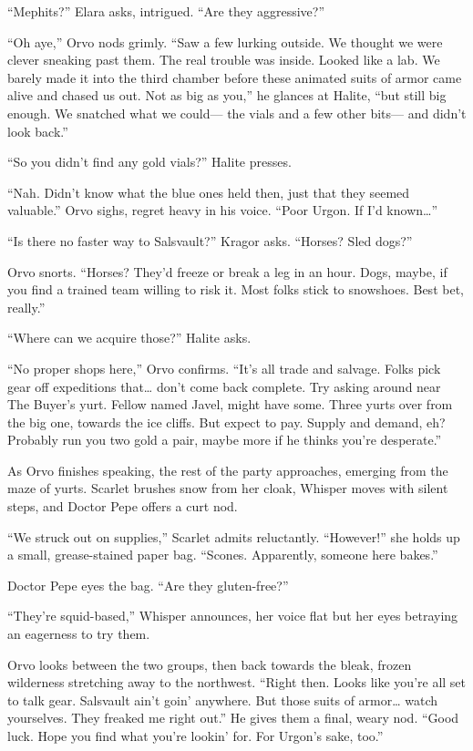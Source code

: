 \documentclass[
  letterpaper,12pt,twoside,twocolumn,openany,
  nodeprecatedcode,bg=full]{dndbook}
\begin{document}
``Mephits?'' Elara asks, intrigued. ``Are they aggressive?''

``Oh aye,'' Orvo nods grimly. ``Saw a few lurking outside. We thought we
were clever sneaking past them. The real trouble was inside. Looked like
a lab. We barely made it into the third chamber before these animated
suits of armor came alive and chased us out. Not as big as you,'' he
glances at Halite, ``but still big enough. We snatched what we could---
the vials and a few other bits--- and didn't look back.''

``So you didn't find any gold vials?'' Halite presses.

``Nah. Didn't know what the blue ones held then, just that they seemed
valuable.'' Orvo sighs, regret heavy in his voice. ``Poor Urgon. If I'd
known\ldots{}''

``Is there no faster way to Salsvault?'' Kragor asks. ``Horses? Sled
dogs?''

Orvo snorts. ``Horses? They'd freeze or break a leg in an hour. Dogs,
maybe, if you find a trained team willing to risk it. Most folks stick
to snowshoes. Best bet, really.''

``Where can we acquire those?'' Halite asks.

``No proper shops here,'' Orvo confirms. ``It's all trade and salvage.
Folks pick gear off expeditions that\ldots{} don't come back complete.
Try asking around near The Buyer's yurt. Fellow named Javel, might have
some. Three yurts over from the big one, towards the ice cliffs. But
expect to pay. Supply and demand, eh? Probably run you two gold a pair,
maybe more if he thinks you're desperate.''

As Orvo finishes speaking, the rest of the party approaches, emerging
from the maze of yurts. Scarlet brushes snow from her cloak, Whisper
moves with silent steps, and Doctor Pepe offers a curt nod.

``We struck out on supplies,'' Scarlet admits reluctantly. ``However!''
she holds up a small, grease-stained paper bag. ``Scones. Apparently,
someone here bakes.''

Doctor Pepe eyes the bag. ``Are they gluten-free?''

``They're squid-based,'' Whisper announces, her voice flat but her eyes
betraying an eagerness to try them.

Orvo looks between the two groups, then back towards the bleak, frozen
wilderness stretching away to the northwest. ``Right then. Looks like
you're all set to talk gear. Salsvault ain't goin' anywhere. But those
suits of armor\ldots{} watch yourselves. They freaked me right out.'' He
gives them a final, weary nod. ``Good luck. Hope you find what you're
lookin' for. For Urgon's sake, too.''
\end{document}
